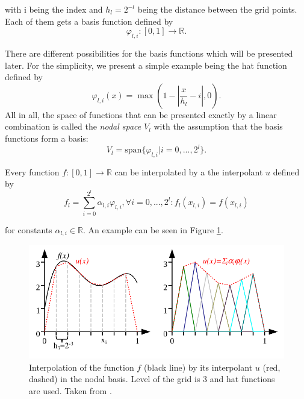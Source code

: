 with i being the index and $ h_l = 2^{-l} $ being the distance between the grid points. Each of them gets a basis function defined by 
\begin{equation}
	\varphi_{l,i}: [0,1] \rightarrow \mathbb{R}.
\end{equation}

There are different possibilities for the basis functions which will be presented later. For the simplicity, we present a simple example being the hat function defined by
\begin{equation}
	\varphi_{l,i}(x) = \max(1- |\frac{x}{h_l}-i|, 0).
\end{equation}
All in all, the space of functions that can be presented exactly by a linear combination is called the \textit{nodal space} $V_l$ with the assumption that the basis functions form a basis:
\begin{equation}
	V_l = \text{span}\{ \varphi_{l,i} | i = 0,...,2^l\}. 
\end{equation}

Every function $f: [0,1] \rightarrow \mathbb{R}$ can be interpolated by a the interpolant $ u $ defined by
\begin{equation}
	f_l = \sum_{i=0}^{2^l}\alpha_{l,i} \varphi_{l,i}, \forall i = 0,...,2^l: f_l(x_{l,i}) = f(x_{l,i})
\end{equation}

for constants $ \alpha_{l,i} \in \mathbb{R} $. An example can be seen in Figure \ref{fig:interpolant}.

\begin{figure}[htbp!]
	\centering
	\includegraphics[scale=0.5]{figures/weighted_sum.png}
	\caption{ Interpolation of the function $ f $ (black line) by its interpolant $ u $ (red, dashed) in the nodal basis. Level of the grid is 3 and hat functions are used. Taken from \cite{pfluger2010spatially}. }
	\label{fig:interpolant}
\end{figure}

